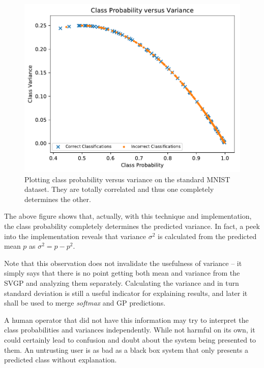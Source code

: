 \documentclass{article}
\begin{document}
\begin{figure}[hbt]
\centering
\includegraphics[width=\hsize]{figures/mnist/mu_versus_var_combined.pdf}
\caption{Plotting class probability versus variance on the standard MNIST dataset. They are totally correlated and thus one completely determines the other.}
\label{fig:all_variances}
\end{figure}

The above figure shows that, actually, with this technique and implementation, the class probability completely determines the predicted variance. In fact, a peek into the implementation reveals that variance $\sigma^2$ is calculated from the predicted mean $p$ as $\sigma^2 = p - p^2$.

Note that this observation does not invalidate the usefulness of variance -- it simply says that there is no point getting both mean and variance from the SVGP and analyzing them separately. Calculating the variance and in turn standard deviation is still a useful indicator for explaining results, and later it shall be used to merge \textit{softmax} and GP predictions.

A human operator that did not have this information may try to interpret the class probabilities and variances independently. While not harmful on its own, it could certainly lead to confusion and doubt about the system being presented to them. An untrusting user is as bad as a black box system that only presents a predicted class without explanation.

\end{document}
